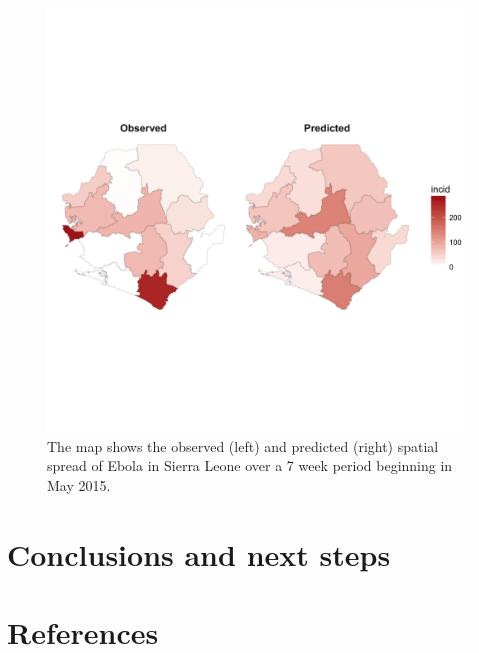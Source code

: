 \documentclass[11pt,]{article}
\begin{document}
\begin{figure}
  \centering
  \includegraphics{ms6-figures/sl-map}
  \caption[Spatial spread of Ebola in Sierra Leone]{The map shows the
    observed (left) and predicted (right) spatial spread of Ebola in
    Sierra Leone over a 7 week period beginning in May 2015.}
  \label{fig:sl-map}
\end{figure}
\FloatBarrier
\section{Conclusions and next steps}\label{sec:conclusions}







\newpage
\section*{References}

\end{document}
